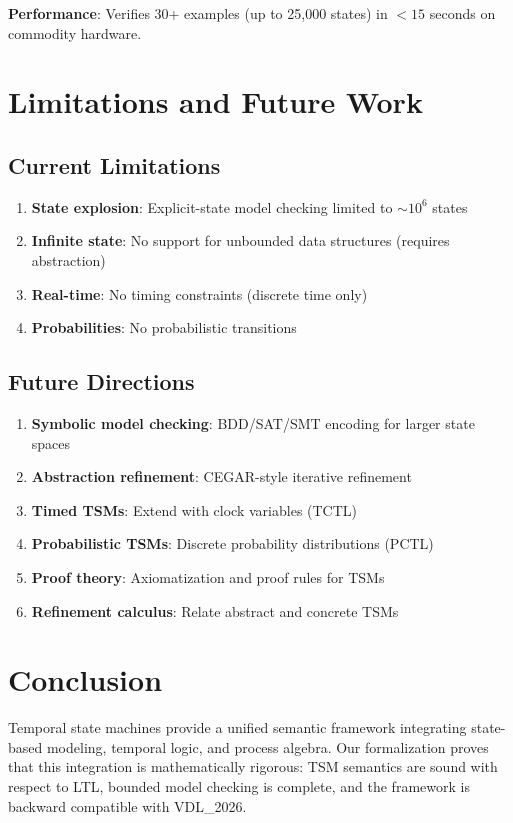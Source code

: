 \documentclass[conference]{IEEEtran}
\begin{document}
\textbf{Performance}: Verifies 30+ examples (up to 25,000 states) in $< 15$ seconds on commodity hardware.

\section{Limitations and Future Work}

\subsection{Current Limitations}

\begin{enumerate}
\item \textbf{State explosion}: Explicit-state model checking limited to $\sim 10^6$ states
\item \textbf{Infinite state}: No support for unbounded data structures (requires abstraction)
\item \textbf{Real-time}: No timing constraints (discrete time only)
\item \textbf{Probabilities}: No probabilistic transitions
\end{enumerate}

\subsection{Future Directions}

\begin{enumerate}
\item \textbf{Symbolic model checking}: BDD/SAT/SMT encoding for larger state spaces
\item \textbf{Abstraction refinement}: CEGAR-style iterative refinement
\item \textbf{Timed TSMs}: Extend with clock variables (TCTL)
\item \textbf{Probabilistic TSMs}: Discrete probability distributions (PCTL)
\item \textbf{Proof theory}: Axiomatization and proof rules for TSMs
\item \textbf{Refinement calculus}: Relate abstract and concrete TSMs
\end{enumerate}

\section{Conclusion}

Temporal state machines provide a unified semantic framework integrating state-based modeling, temporal logic, and process algebra. Our formalization proves that this integration is mathematically rigorous: TSM semantics are sound with respect to LTL, bounded model checking is complete, and the framework is backward compatible with VDL\_2026.
\end{document}
